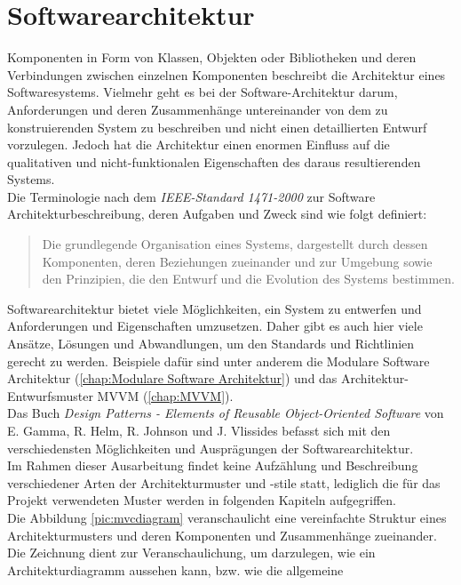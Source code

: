 \section{Softwarearchitektur}
\label{chap:Softwarearchitektur}
Komponenten in Form von Klassen, Objekten oder Bibliotheken und deren Verbindungen zwischen einzelnen Komponenten beschreibt die Architektur 
eines Softwaresystems. Vielmehr geht es bei der Software-Architektur darum, Anforderungen und deren Zusammenhänge untereinander von dem zu 
konstruierenden System zu beschreiben und nicht einen detaillierten Entwurf vorzulegen. Jedoch hat die Architektur einen enormen Einfluss 
auf die qualitativen und nicht-funktionalen Eigenschaften des daraus resultierenden Systems. 
\\ 
\linebreak
Die Terminologie nach dem \textit{IEEE-Standard 1471-2000} zur Software Architekturbeschreibung, deren Aufgaben und Zweck \cite{swarchitekturieee.2005} 
sind wie folgt definiert: 
\begin{quote}
    Die grundlegende Organisation eines Systems, dargestellt durch dessen Komponenten, deren Beziehungen zueinander und zur Umgebung sowie den 
    Prinzipien, die den Entwurf und die Evolution des Systems bestimmen. \cite{architektursw.2006f}
\end{quote}
Softwarearchitektur bietet viele Möglichkeiten, ein System zu entwerfen und Anforderungen und Eigenschaften umzusetzen. Daher gibt es auch 
hier viele Ansätze, Lösungen und Abwandlungen, um den Standards und Richtlinien gerecht zu werden. Beispiele dafür sind unter anderem die 
Modulare Software Architektur (\ref{chap:Modulare Software Architektur}) und das Architektur-Entwurfsmuster MVVM (\ref{chap:MVVM}).
\\
Das Buch \textit{Design Patterns - Elements of Reusable Object-Oriented Software} von E. Gamma, R. Helm, R. Johnson und J. Vlissides befasst 
sich mit den verschiedensten Möglichkeiten und Ausprägungen der Softwarearchitektur. 
\\ 
Im Rahmen dieser Ausarbeitung findet keine Aufzählung und Beschreibung verschiedener Arten der Architekturmuster und -stile statt, lediglich die 
für das Projekt verwendeten Muster werden in folgenden Kapiteln aufgegriffen. 
\\ 
\linebreak
Die Abbildung \ref{pic:mvcdiagram} veranschaulicht eine vereinfachte Struktur eines Architekturmusters und deren Komponenten und Zusammenhänge 
zueinander. Die Zeichnung dient zur Veranschaulichung, um darzulegen, wie ein Architekturdiagramm aussehen kann, bzw. wie die allgemeine 
